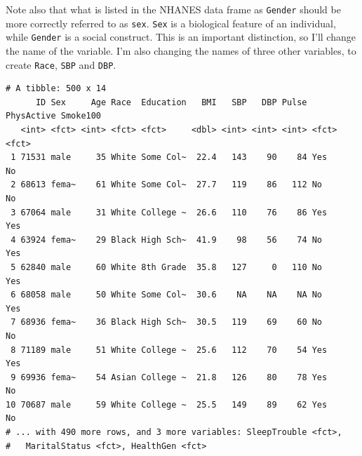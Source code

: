 \documentclass[
]{book}
\newenvironment{Shaded}{\begin{snugshade}}{\end{snugshade}}
\newcommand{\CommentTok}[1]{\textcolor[rgb]{0.56,0.35,0.01}{\textit{#1}}}
\newcommand{\DataTypeTok}[1]{\textcolor[rgb]{0.13,0.29,0.53}{#1}}
\newcommand{\DecValTok}[1]{\textcolor[rgb]{0.00,0.00,0.81}{#1}}
\newcommand{\KeywordTok}[1]{\textcolor[rgb]{0.13,0.29,0.53}{\textbf{#1}}}
\newcommand{\NormalTok}[1]{#1}
\newcommand{\OperatorTok}[1]{\textcolor[rgb]{0.81,0.36,0.00}{\textbf{#1}}}
\newcommand{\StringTok}[1]{\textcolor[rgb]{0.31,0.60,0.02}{#1}}
\begin{document}
Note also that what is listed in the NHANES data frame as \texttt{Gender} should be more correctly referred to as \texttt{sex}. \texttt{Sex} is a biological feature of an individual, while \texttt{Gender} is a social construct. This is an important distinction, so I'll change the name of the variable. I'm also changing the names of three other variables, to create \texttt{Race}, \texttt{SBP} and \texttt{DBP}.

\begin{Shaded}
\end{Shaded}

\begin{verbatim}
# A tibble: 500 x 14
      ID Sex     Age Race  Education   BMI   SBP   DBP Pulse PhysActive Smoke100
   <int> <fct> <int> <fct> <fct>     <dbl> <int> <int> <int> <fct>      <fct>   
 1 71531 male     35 White Some Col~  22.4   143    90    84 Yes        No      
 2 68613 fema~    61 White Some Col~  27.7   119    86   112 No         No      
 3 67064 male     31 White College ~  26.6   110    76    86 Yes        Yes     
 4 63924 fema~    29 Black High Sch~  41.9    98    56    74 No         Yes     
 5 62840 male     60 White 8th Grade  35.8   127     0   110 No         Yes     
 6 68058 male     50 White Some Col~  30.6    NA    NA    NA No         Yes     
 7 68936 fema~    36 Black High Sch~  30.5   119    69    60 No         No      
 8 71189 male     51 White College ~  25.6   112    70    54 Yes        Yes     
 9 69936 fema~    54 Asian College ~  21.8   126    80    78 Yes        No      
10 70687 male     59 White College ~  25.5   149    89    62 Yes        No      
# ... with 490 more rows, and 3 more variables: SleepTrouble <fct>,
#   MaritalStatus <fct>, HealthGen <fct>
\end{verbatim}
\end{document}
